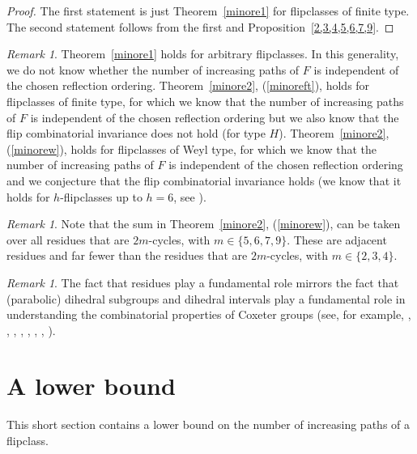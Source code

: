 \documentclass[12pt,reqno]{amsart}
\theoremstyle{plain}
\theoremstyle{definition}
\theoremstyle{remark}
\newtheorem{rmk}[thm]{Remark}
\begin{document}
\begin{proof}
The first statement is just Theorem~\ref{minore1} for flipclasses of finite type. The second statement follows from the first and Proposition~\ref{2,3,4,5,6,7,9}.
\end{proof}



\begin{rmk}
Theorem~\ref{minore1} holds for arbitrary flipclasses. In this generality, we do not know whether the number of increasing paths of $F$ is independent of the chosen reflection ordering. Theorem~\ref{minore2}, (\ref{minoreft}), holds for flipclasses of finite type, for which we know that  the number of increasing paths of $F$ is independent of the chosen reflection ordering but we also know that the flip combinatorial invariance does not hold (for type $H$). 
Theorem~\ref{minore2}, (\ref{minorew}), holds for flipclasses of Weyl type, for which we know that  the number of increasing paths of $F$ is independent of the chosen reflection ordering and we conjecture  that the flip combinatorial invariance  holds (we know that it holds for $h$-flipclasses up to $h=6$, see \cite{EMS}). 
\end{rmk}

\begin{rmk}
Note that the sum in Theorem~\ref{minore2}, (\ref{minorew}), can be taken over all residues that are $2m$-cycles, with $m\in\{5,6,7,9\}$. These are adjacent residues and far fewer than the residues that are $2m$-cycles, with $m\in\{2,3,4\}$. 
\end{rmk}

\begin{rmk}
The fact that residues play a fundamental role mirrors the fact that (parabolic) dihedral subgroups and dihedral intervals play a fundamental role in understanding the combinatorial properties of Coxeter groups (see, for example, \cite{BCM1}, \cite{CMEur}, \cite{CMDis}, \cite{DyeComp1}, \cite{DyeComp}, \cite{DyePre}, \cite{Mtrans}, \cite{M}).
\end{rmk}



\section{A lower bound}

This short section contains a lower bound on the number of increasing paths of a flipclass.
\end{document}
